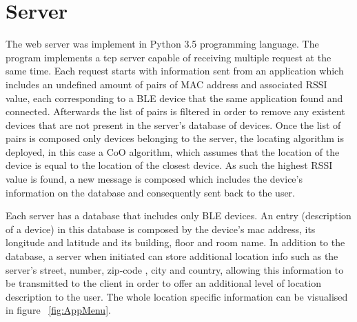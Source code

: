 \section{Server}
\label{sec:server}

The web server was implement in Python 3.5 programming language. The program implements a tcp server capable of receiving multiple request at the same time. Each request starts with information sent from an application which includes an undefined amount of pairs of MAC address and associated RSSI value, each corresponding to a \ac{BLE} device that the same application found and connected. Afterwards the list of pairs is filtered in order to remove any existent devices that are not present in the server's database of devices. Once the list of pairs is composed only devices belonging to the server, the locating algorithm is deployed, in this case a \ac{CoO} algorithm, which assumes that the location of the device is equal to the location of the closest device. As such the highest \ac{RSSI} value is found, a new message is composed which includes the device's information on the database and consequently sent back to the user. 

Each server has a database that includes only \ac{BLE} devices. An entry (description of a device) in this database is composed by the device's mac address, its longitude and latitude and its building, floor and room name. In addition to the database, a server when initiated can store additional location info such as the server's street, number, zip-code , city and country, allowing this information to be transmitted to the client in order to offer an additional level of location description to the user. The whole location specific information can be visualised in figure ~\ref{fig:AppMenu}.
